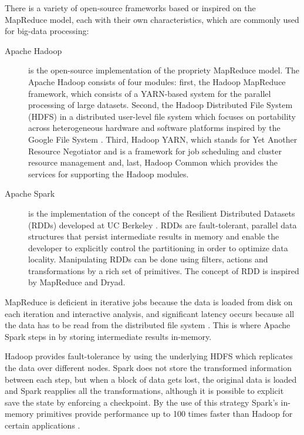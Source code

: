 There is a variety of open-source frameworks based or inspired on the MapReduce model, each with their own characteristics, which are commonly used for big-data processing:
\begin{description}
    \item[Apache Hadoop] is the open-source implementation of the propriety MapReduce model. The Apache Hadoop consists of four modules: first, the Hadoop MapReduce framework, which consists of a YARN-based system for the parallel processing of large datasets. Second, the Hadoop Distributed File System (HDFS) in a distributed user-level file system which focuses on portability across heterogeneous hardware and software platforms \cite{5452045} inspired by the Google File System \cite{Ghemawat:2003:GFS:1165389.945450}. Third, Hadoop YARN, which stands for Yet Another Resource Negotiator and is a framework for job scheduling and cluster resource management \cite{Vavilapalli:2013:AHY:2523616.2523633} and, last, Hadoop Common which provides the services for supporting the Hadoop modules.
    \item[Apache Spark] is the implementation of the concept of the Resilient Distributed Datasets (RDDs) developed at UC Berkeley \cite{180560}. RDDs are fault-tolerant, parallel data structures that persist intermediate results in memory and enable the developer to explicitly control the partitioning in order to optimize data locality. Manipulating RDDs can be done using filters, actions and transformations by a rich set of primitives. The concept of RDD is inspired by MapReduce and Dryad.
\end{description}

MapReduce is deficient in iterative jobs because the data is loaded from disk on each iteration and interactive analysis, and significant latency occurs because all the data has to be read from the distributed file system \cite{Zaharia:2010:SCC:1863103.1863113}. This is where Apache Spark steps in by storing intermediate results in-memory.

Hadoop provides fault-tolerance by using the underlying HDFS which replicates the data over different nodes. Spark does not store the transformed information between each step, but when a block of data gets lost, the original data is loaded and Spark reapplies all the transformations, although it is possible to explicit save the state by enforcing a checkpoint. By the use of this strategy Spark's in-memory primitives provide performance up to 100 times faster than Hadoop for certain applications \cite{Xin:2013:SSR:2463676.2465288}.